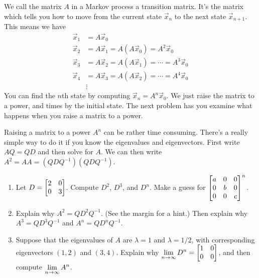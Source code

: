 We call the matrix $A$ in a Markov process a transition matrix.  It's the matrix which tells you how to move from the current state $\vec x_n$ to the next state $\vec x_{n+1}$. This means we have 
\begin{align*}
\vec x_1 &= A\vec x_0\\
\vec x_2 &= A\vec x_1 = A(A\vec x_0) = A^2\vec x_0\\
\vec x_3 &= A\vec x_2 = A(A\vec x_1) =\cdots = A^3\vec x_0\\
\vec x_4 &= A\vec x_3 = A(A\vec x_2) =\cdots = A^4\vec x_0\\
&\vdots
\end{align*}
You can find the $n$th state by computing $\vec x_n = A^n \vec x_0$. We just raise the matrix to a power, and times by the initial state. The next problem has you examine what happens when you raise a matrix to a power. 
\begin{problem}
 Raising a matrix to a power $A^n$ can be rather time consuming.  There's a really simple way to do it if you know the eigenvalues and eigenvectors. First write $AQ=QD$ and then solve for $A$.  We can then write $A^2 = AA=(QDQ^{-1})(QDQ^{-1})$.
\begin{enumerate}
 \item Let $D=\begin{bmatrix} 2&0\\0&3 \end{bmatrix}$.  Compute $D^2$, $D^3$, and $D^n$. Make a guess for $\begin{bmatrix} a&0&0\\0&b&0\\0&0&c \end{bmatrix}^n$.
 \item {}%
Explain why $A^2 = QD^2Q^{-1}$. (See the margin for a hint.) Then explain why $A^3 = QD^3Q^{-1}$ and $A^n = QD^nQ^{-1}$.
 \item Suppose that the eigenvalues of $A$ are $\lambda = 1$ and $\lambda =1/2$, with corresponding eigenvectors $(1,2)$ and $(3,4)$.  Explain why $\displaystyle \lim_{n\to\infty}D^n = \begin{bmatrix} 1&0\\0&0 \end{bmatrix}$, and then compute $\displaystyle\lim_{n\to\infty}A^n$.      
\end{enumerate}

\end{problem}





 
 
